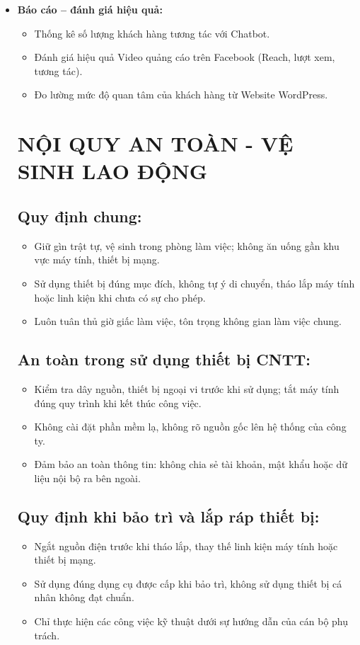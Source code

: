\begin{itemize}
    \item \textbf{Báo cáo – đánh giá hiệu quả:}
    \begin{itemize}
        \item Thống kê số lượng khách hàng tương tác với Chatbot.
        \item Đánh giá hiệu quả Video quảng cáo trên Facebook (Reach, lượt xem, tương tác).
        \item Đo lường mức độ quan tâm của khách hàng từ Website WordPress.
    \end{itemize}
\section{NỘI QUY AN TOÀN - VỆ SINH LAO ĐỘNG}
\begin{itemize}
    \subsection{Quy định chung:}
    \begin{itemize}
        \item Giữ gìn trật tự, vệ sinh trong phòng làm việc; không ăn uống gần khu vực máy tính, thiết bị mạng.
        \item Sử dụng thiết bị đúng mục đích, không tự ý di chuyển, tháo lắp máy tính hoặc linh kiện khi chưa có sự cho phép.
        \item Luôn tuân thủ giờ giấc làm việc, tôn trọng không gian làm việc chung.
    \end{itemize}

    \subsection{An toàn trong sử dụng thiết bị CNTT:}
    \begin{itemize}
        \item Kiểm tra dây nguồn, thiết bị ngoại vi trước khi sử dụng; tắt máy tính đúng quy trình khi kết thúc công việc.
        \item Không cài đặt phần mềm lạ, không rõ nguồn gốc lên hệ thống của công ty.
        \item Đảm bảo an toàn thông tin: không chia sẻ tài khoản, mật khẩu hoặc dữ liệu nội bộ ra bên ngoài.
    \end{itemize}

    \subsection{Quy định khi bảo trì và lắp ráp thiết bị:}
    \begin{itemize}
        \item Ngắt nguồn điện trước khi tháo lắp, thay thế linh kiện máy tính hoặc thiết bị mạng.
        \item Sử dụng đúng dụng cụ được cấp khi bảo trì, không sử dụng thiết bị cá nhân không đạt chuẩn.
        \item Chỉ thực hiện các công việc kỹ thuật dưới sự hướng dẫn của cán bộ phụ trách.
    \end{itemize}


\end{itemize}
\end{itemize}
